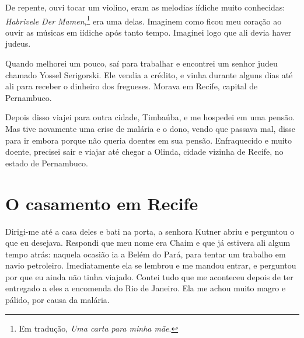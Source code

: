 
De repente, ouvi tocar um violino, eram
as melodias iídiche muito conhecidas: \textit{Habrivele Der Mamen},\footnote{Em tradução, \textit{Uma carta para minha mãe}.} era uma delas. Imaginem como ficou meu coração ao ouvir as músicas em iídiche após tanto tempo. Imaginei logo que ali devia haver judeus.

Quando melhorei um pouco, saí para trabalhar e encontrei um senhor judeu
chamado Yossel Serigorski. Ele vendia a crédito, e vinha durante alguns
dias até ali para receber o dinheiro dos fregueses. Morava em Recife, capital de Pernambuco.

Depois disso viajei para outra cidade, Timbaúba, e me hospedei em
uma pensão. Mas tive novamente uma crise de malária e o dono, vendo que passava mal, disse para ir embora porque não queria doentes
em sua pensão. Enfraquecido e muito doente, precisei sair e viajar até
chegar a Olinda, cidade vizinha de Recife, no estado de Pernambuco.

\chapter{O casamento em Recife}


Dirigi-me até a casa deles e bati na porta, a senhora Kutner abriu e
perguntou o que eu desejava. Respondi que meu nome era Chaim e que já estivera ali algum tempo
atrás: naquela ocasião ia a Belém do Pará, para tentar um trabalho em navio petroleiro. Imediatamente ela se
lembrou e me mandou entrar, e perguntou por que eu ainda não tinha viajado. 
Contei tudo que me aconteceu depois de ter entregado a eles a encomenda do Rio de Janeiro. Ela me achou muito magro e pálido, por causa da malária.

